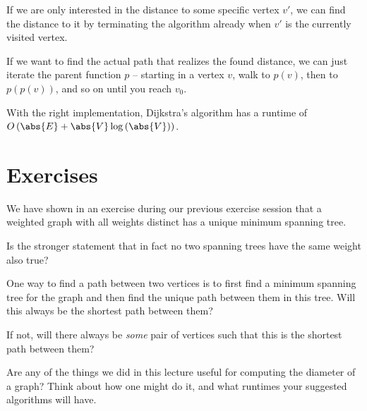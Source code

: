\documentclass[nobib]{tufte-handout}
\begin{document}
\begin{remark}
  If we are only interested in the distance to some specific vertex $v'$, we can find the distance to it by terminating the algorithm already when $v'$ is the currently visited vertex.

  If we want to find the actual path that realizes the found distance, we can just iterate the parent function $p$ -- starting in a vertex $v$, walk to $p(v)$, then to $p(p(v))$, and so on until you reach $v_0$.

  With the right implementation, Dijkstra's algorithm has a runtime of $O\left(\abs{E} + \abs{V}\log\left(\abs{V}\right)\right)$.
\end{remark}

\section{Exercises}
 
\begin{xca}
  We have shown in an exercise during our previous exercise session that a weighted graph with all weights distinct has a unique minimum spanning tree.

  Is the stronger statement that in fact no two spanning trees have the same weight also true?
\end{xca}

\begin{xca}
  One way to find a path between two vertices is to first find a minimum spanning tree for the graph and then find the unique path between them in this tree. Will this always be the shortest path between them?

  If not, will there always be \emph{some} pair of vertices such that this is the shortest path between them?
\end{xca}

\begin{xca}
  Are any of the things we did in this lecture useful for computing the diameter of a graph? Think about how one might do it, and what runtimes your suggested algorithms will have.
\end{xca}
\end{document}
